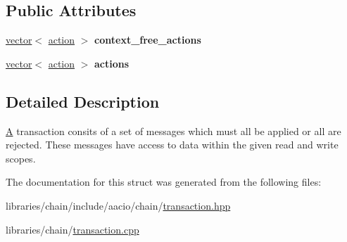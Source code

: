 \subsection*{Public Attributes}
\begin{DoxyCompactItemize}
\item 
\mbox{\label{structaacio_1_1chain_1_1transaction_a29af80508c52684ee8b599369e6d0792}} 
\mbox{\hyperlink{classstd_1_1vector}{vector}}$<$ \mbox{\hyperlink{structaacio_1_1chain_1_1action}{action}} $>$ {\bfseries context\+\_\+free\+\_\+actions}
\item 
\mbox{\label{structaacio_1_1chain_1_1transaction_a1ebda7115a8365a0b2c726c93c319a8c}} 
\mbox{\hyperlink{classstd_1_1vector}{vector}}$<$ \mbox{\hyperlink{structaacio_1_1chain_1_1action}{action}} $>$ {\bfseries actions}
\end{DoxyCompactItemize}


\subsection{Detailed Description}
\mbox{\hyperlink{struct_a}{A}} transaction consits of a set of messages which must all be applied or all are rejected. These messages have access to data within the given read and write scopes. 

The documentation for this struct was generated from the following files\+:\begin{DoxyCompactItemize}
\item 
libraries/chain/include/aacio/chain/\mbox{\hyperlink{libraries_2chain_2include_2aacio_2chain_2transaction_8hpp}{transaction.\+hpp}}\item 
libraries/chain/\mbox{\hyperlink{transaction_8cpp}{transaction.\+cpp}}\end{DoxyCompactItemize}
